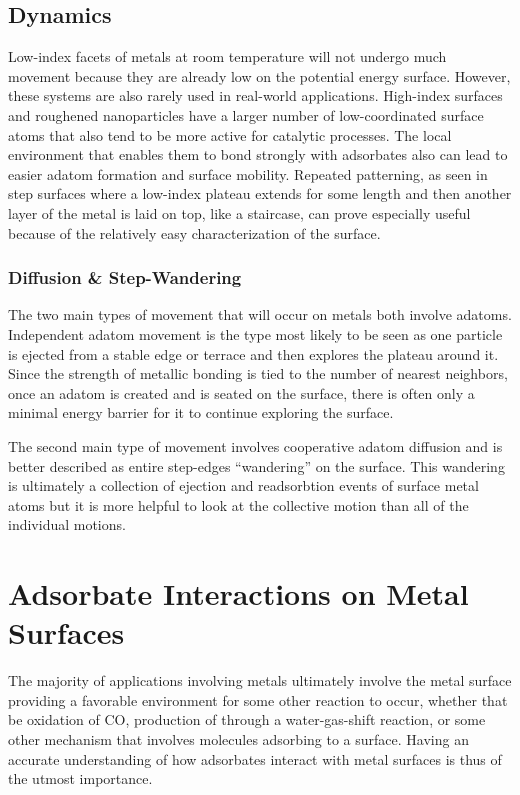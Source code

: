 \subsection{Dynamics}
Low-index facets of metals at room temperature will not undergo much movement
because they are already low on the potential energy surface. However, these
systems are also rarely used in real-world applications. High-index surfaces
and roughened nanoparticles have a larger number of low-coordinated surface
atoms that also tend to be more active for catalytic processes. The local
environment that enables them to bond strongly with adsorbates also can lead to
easier adatom formation and surface mobility. Repeated patterning, as seen in
step surfaces where a low-index plateau extends for some length and then
another layer of the metal is laid on top, like a staircase, can prove
especially useful because of the relatively easy characterization of the
surface.

\subsubsection{Diffusion \& Step-Wandering}
The two main types of movement that will occur on metals both involve adatoms.
Independent adatom movement is the type most likely to be seen as one particle
is ejected from a stable edge or terrace and then explores the plateau around
it. Since the strength of metallic bonding is tied to the number of nearest
neighbors, once an adatom is created and is seated on the surface, there is
often only a minimal energy barrier for it to continue exploring the surface. 

The second main type of movement involves cooperative adatom diffusion and is
better described as entire step-edges ``wandering'' on the surface. This
wandering is ultimately a collection of ejection and readsorbtion events of
surface metal atoms but it is more helpful to look at the collective motion
than all of the individual motions.

\section{Adsorbate Interactions on Metal Surfaces}
The majority of applications involving metals ultimately involve the metal
surface providing a favorable environment for some other reaction to occur,
whether that be oxidation of CO, production of  through a
water-gas-shift reaction, or some other mechanism that involves molecules
adsorbing to a surface. Having an accurate understanding of how adsorbates
interact with metal surfaces is thus of the utmost importance. 

